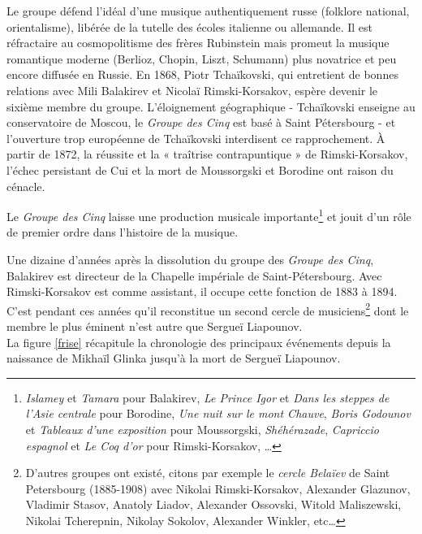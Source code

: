 Le groupe défend l'idéal d'une musique authentiquement russe (folklore national, orientalisme), libérée de la tutelle des écoles italienne ou allemande. Il est réfractaire au cosmopolitisme des frères Rubinstein mais promeut la musique romantique moderne (Berlioz, Chopin, Liszt, Schumann) plus novatrice et peu encore diffusée en Russie. En 1868, Piotr Tchaïkovski, qui entretient de bonnes relations avec Mili Balakirev et Nicolaï Rimski-Korsakov, espère devenir le sixième membre du groupe. L'éloignement géographique - Tchaïkovski enseigne au conservatoire de Moscou, le \emph{Groupe des Cinq} est basé à Saint Pétersbourg - et l'ouverture trop européenne de Tchaïkovski interdisent ce rapprochement. À partir de 1872, la réussite et la « traîtrise contrapuntique » de Rimski-Korsakov, l'échec persistant de Cui et la mort de Moussorgski et Borodine ont raison du cénacle.

Le \emph{Groupe des Cinq} laisse une production musicale importante\footnote{\emph{Islamey} et \emph{Tamara} pour Balakirev, \emph{Le Prince Igor} et \emph{Dans les steppes de l'Asie centrale} pour Borodine, \emph{Une nuit sur le mont Chauve}, \emph{Boris Godounov} et \emph{Tableaux d'une exposition} pour Moussorgski, \emph{Shéhérazade}, \emph{Capriccio espagnol} et \emph{Le Coq d'or} pour Rimski-Korsakov, \dots} et jouit d'un rôle de premier ordre dans l'histoire de la musique.

Une dizaine d'années après la dissolution du groupe des \emph{Groupe des Cinq}, Balakirev est directeur de la Chapelle impériale de Saint-Pétersbourg. Avec Rimski-Korsakov est comme assistant, il occupe cette fonction de 1883 à 1894. C'est pendant ces années qu'il reconstitue un second cercle de musiciens\footnote{D'autres groupes ont existé, citons par exemple le \emph{cercle Belaïev} de Saint Petersbourg (1885-1908) avec Nikolai Rimski-Korsakov, Alexander Glazunov, Vladimir Stasov, Anatoly Liadov, Alexander Ossovski, Witold Maliszewski, Nikolai Tcherepnin, Nikolay Sokolov, Alexander Winkler, etc\dots} dont le membre le plus éminent n'est autre que Sergueï Liapounov.\\

La figure \ref{frise} récapitule la chronologie des principaux événements depuis la naissance de Mikhaïl Glinka jusqu'à la mort de Sergueï Liapounov.

